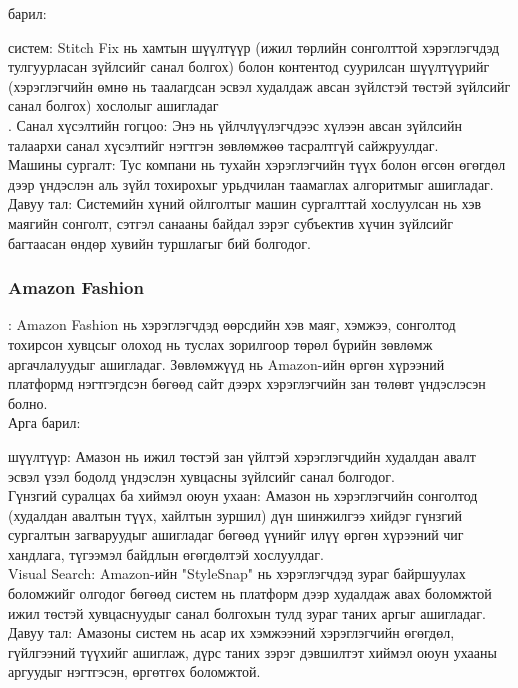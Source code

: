  барил:

 систем: Stitch Fix нь хамтын шүүлтүүр (ижил төрлийн сонголттой хэрэглэгчдэд тулгуурласан зүйлсийг санал болгох) болон контентод суурилсан шүүлтүүрийг (хэрэглэгчийн өмнө нь таалагдсан эсвэл худалдаж авсан зүйлстэй төстэй зүйлсийг санал болгох) хослолыг ашигладаг\\.
Санал хүсэлтийн гогцоо: Энэ нь үйлчлүүлэгчдээс хүлээн авсан зүйлсийн талаархи санал хүсэлтийг нэгтгэн зөвлөмжөө тасралтгүй сайжруулдаг.\\
Машины сургалт: Тус компани нь тухайн хэрэглэгчийн түүх болон өгсөн өгөгдөл дээр үндэслэн аль зүйл тохирохыг урьдчилан таамаглах алгоритмыг ашигладаг.\\
Давуу тал: Системийн хүний ойлголтыг машин сургалттай хослуулсан нь хэв маягийн сонголт, сэтгэл санааны байдал зэрэг субъектив хүчин зүйлсийг багтаасан өндөр хувийн туршлагыг бий болгодог.
\subsubsection{Amazon Fashion}
: Amazon Fashion нь хэрэглэгчдэд өөрсдийн хэв маяг, хэмжээ, сонголтод тохирсон хувцсыг олоход нь туслах зорилгоор төрөл бүрийн зөвлөмж аргачлалуудыг ашигладаг. Зөвлөмжүүд нь Amazon-ийн өргөн хүрээний платформд нэгтгэгдсэн бөгөөд сайт дээрх хэрэглэгчийн зан төлөвт үндэслэсэн болно.\\

Арга барил:

 шүүлтүүр: Амазон нь ижил төстэй зан үйлтэй хэрэглэгчдийн худалдан авалт эсвэл үзэл бодолд үндэслэн хувцасны зүйлсийг санал болгодог.\\
Гүнзгий суралцах ба хиймэл оюун ухаан: Амазон нь хэрэглэгчийн сонголтод (худалдан авалтын түүх, хайлтын зуршил) дүн шинжилгээ хийдэг гүнзгий сургалтын загваруудыг ашигладаг бөгөөд үүнийг илүү өргөн хүрээний чиг хандлага, түгээмэл байдлын өгөгдөлтэй хослуулдаг.\\
Visual Search: Amazon-ийн "StyleSnap" нь хэрэглэгчдэд зураг байршуулах боломжийг олгодог бөгөөд систем нь платформ дээр худалдаж авах боломжтой ижил төстэй хувцаснуудыг санал болгохын тулд зураг таних аргыг ашигладаг.\\
Давуу тал: Амазоны систем нь асар их хэмжээний хэрэглэгчийн өгөгдөл, гүйлгээний түүхийг ашиглаж, дүрс таних зэрэг дэвшилтэт хиймэл оюун ухааны аргуудыг нэгтгэсэн, өргөтгөх боломжтой.


